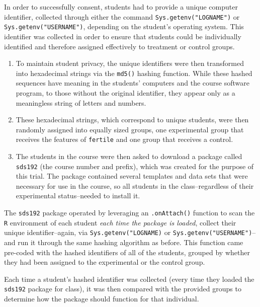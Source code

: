 \documentclass[12pt,twoside]{reedthesis}
\begin{document}
In order to successfully consent, students had to provide a unique computer identifier, collected through either the command \texttt{Sys.getenv("LOGNAME")} or \texttt{Sys.getenv("USERNAME")}, depending on the student's operating system. This identifier was collected in order to ensure that students could be individually identified and therefore assigned effectively to treatment or control groups.
\begin{enumerate}
\def\labelenumi{\arabic{enumi}.}
\setcounter{enumi}{1}
\item
  To maintain student privacy, the unique identifiers were then transformed into hexadecimal strings via the \texttt{md5()} hashing function. While these hashed sequences have meaning in the students' computers and the course software program, to those without the original identifier, they appear only as a meaningless string of letters and numbers.
\item
  These hexadecimal strings, which correspond to unique students, were then randomly assigned into equally sized groups, one experimental group that receives the features of \texttt{fertile} and one group that receives a control.
\item
  The students in the course were then asked to download a package called \texttt{sds192} (the course number and prefix), which was created for the purpose of this trial. The package contained several templates and data sets that were necessary for use in the course, so all students in the class--regardless of their experimental status--needed to install it.
\end{enumerate}
The \texttt{sds192} package operated by leveraging an \texttt{.onAttach()} function to scan the \texttt{R} environment of each student \emph{each time the package is loaded}, collect their unique identifier--again, via \texttt{Sys.getenv("LOGNAME)} or \texttt{Sys.getenv("USERNAME")}-- and run it through the same hashing algorithm as before. This function came pre-coded with the hashed identifiers of all of the students, grouped by whether they had been assigned to the experimental or the control group.

Each time a student's hashed identifier was collected (every time they loaded the \texttt{sds192} package for class), it was then compared with the provided groups to determine how the package should function for that individual.
\end{document}
